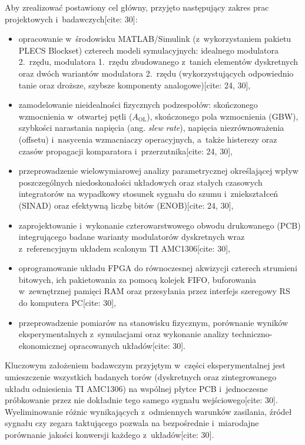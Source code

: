 Aby zrealizować postawiony cel główny, przyjęto następujący zakres prac projektowych i~badawczych[cite: 30]:
\begin{itemize}
	\item opracowanie w~środowisku MATLAB/Simulink (z~wykorzystaniem pakietu PLECS Blockset) czterech modeli symulacyjnych: idealnego modulatora 2.~rzędu, modulatora 1.~rzędu zbudowanego z~tanich elementów dyskretnych oraz dwóch wariantów modulatora 2.~rzędu (wykorzystujących odpowiednio tanie oraz droższe, szybsze komponenty analogowe)[cite: 24, 30],
	\item zamodelowanie nieidealności fizycznych podzespołów: skończonego wzmocnienia w~otwartej pętli ($A_{\text{OL}}$), skończonego pola wzmocnienia (GBW), szybkości narastania napięcia (ang. \textit{slew rate}), napięcia niezrównoważenia (offsetu) i~nasycenia wzmacniaczy operacyjnych, a~także histerezy oraz czasów propagacji komparatora i~przerzutnika[cite: 24, 30],
	\item przeprowadzenie wielowymiarowej analizy parametrycznej określającej wpływ poszczególnych niedoskonałości układowych oraz stałych czasowych integratorów na wypadkowy stosunek sygnału do szumu i~zniekształceń (SINAD) oraz efektywną liczbę bitów (ENOB)[cite: 24, 30],
	\item zaprojektowanie i~wykonanie czterowarstwowego obwodu drukowanego (PCB) integrującego badane warianty modulatorów dyskretnych wraz z~referencyjnym układem scalonym TI AMC1306[cite: 30],
	\item oprogramowanie układu FPGA do równoczesnej akwizycji czterech strumieni bitowych, ich pakietowania za pomocą kolejek FIFO, buforowania w~zewnętrznej pamięci RAM oraz przesyłania przez interfejs szeregowy RS do komputera PC[cite: 30],
	\item przeprowadzenie pomiarów na stanowisku fizycznym, porównanie wyników eksperymentalnych z~symulacjami oraz wykonanie analizy techniczno-ekonomicznej opracowanych układów[cite: 30].
\end{itemize}

Kluczowym założeniem badawczym przyjętym w~części eksperymentalnej jest umieszczenie wszystkich badanych torów (dyskretnych oraz zintegrowanego układu odniesienia TI AMC1306) na wspólnej płytce PCB i~jednoczesne próbkowanie przez nie dokładnie tego samego sygnału wejściowego[cite: 30]. Wyeliminowanie różnic wynikających z~odmiennych warunków zasilania, źródeł sygnału czy zegara taktującego pozwala na bezpośrednie i~miarodajne porównanie jakości konwersji każdego z~układów[cite: 30].

